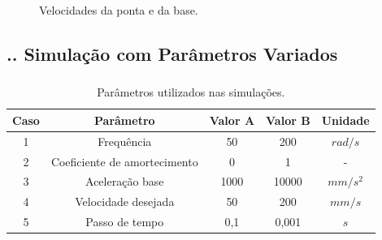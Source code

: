 \documentclass[aspectratio=169]{beamer}
\begin{document}
\begin{frame}
  \frametitle{\insertsubsection}
  \begin{figure}[H]
    \centering
    \caption{Velocidades da ponta e da base.}
    \hfill
    \label{fig:ref_vel}
  \end{figure}
\end{frame}

\subsection{\insertsectionnumber .\insertsubsectionnumber . Simulação com Parâmetros Variados}
\begin{frame}
  \frametitle{\insertsubsection}
  \begin{table}
    \begin{center}
    \caption{Parâmetros utilizados nas simulações.}
    \label{tab:sim_params}
    \begin{tabular}{c c c c c}
        Caso & Parâmetro & Valor A & Valor B & Unidade\\ \hline
        1 & Frequência & 50 & 200 & $rad/s$\\
        2 & Coeficiente de amortecimento & 0 & 1 & - \\
        3 & Aceleração base & 1000 & 10000 & $mm/s^2$ \\
        4 & Velocidade desejada & 50 & 200 & $mm/s$ \\
        5 & Passo de tempo & 0,1 & 0,001 & $s$ \\ \hline
    \end{tabular}
    \end{center}
  \end{table}
\end{frame}
\end{document}
